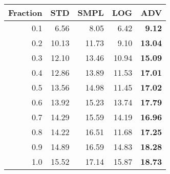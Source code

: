 \documentclass{standalone}
\begin{document}
\begin{tabular}{r|rrrr}
      \toprule
      Fraction & STD & SMPL & LOG & ADV\\
      \midrule
      0.1 & 6.56 & 8.05 & 6.42 & \textbf{9.12}\\
  0.2 & 10.13 & 11.73 & 9.10 & \textbf{13.04}\\
  0.3 & 12.10 & 13.46 & 10.94 & \textbf{15.09}\\
  0.4 & 12.86 & 13.89 & 11.53 & \textbf{17.01}\\
  0.5 & 13.56 & 14.98 & 11.45 & \textbf{17.02}\\
  0.6 & 13.92 & 15.23 & 13.74 & \textbf{17.79}\\
  0.7 & 14.29 & 15.59 & 14.19 & \textbf{16.96}\\
  0.8 & 14.22 & 16.51 & 11.68 & \textbf{17.25}\\
  0.9 & 14.89 & 16.59 & 14.83 & \textbf{18.28}\\
  1.0 & 15.52 & 17.14 & 15.87 & \textbf{18.73}\\
  \bottomrule
\end{tabular}
\end{document}

